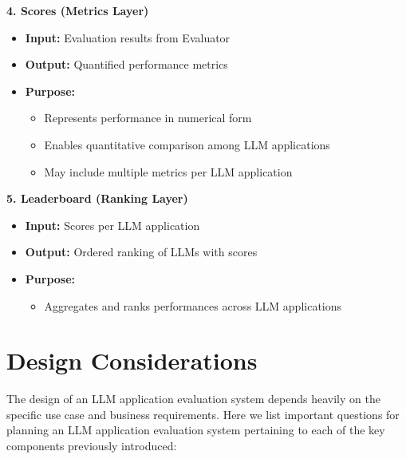 \textbf{4. Scores (Metrics Layer)}
\begin{itemize}
    \item \textbf{Input:} Evaluation results from Evaluator
    \item \textbf{Output:} Quantified performance metrics
    \item \textbf{Purpose:}
    \begin{itemize}
        \item Represents performance in numerical form
        \item Enables quantitative comparison among LLM applications
        \item May include multiple metrics per LLM application
    \end{itemize}
\end{itemize}

\textbf{5. Leaderboard (Ranking Layer)}
\begin{itemize}
    \item \textbf{Input:} Scores per LLM application
    \item \textbf{Output:} Ordered ranking of LLMs with scores
    \item \textbf{Purpose:}
    \begin{itemize}
        \item Aggregates and ranks performances across LLM applications
    \end{itemize}
\end{itemize}

\section{Design Considerations}

The design of an LLM application evaluation system depends heavily on the specific use case and business requirements. Here we list important questions for planning an LLM application evaluation system pertaining to each of the key components previously introduced:

